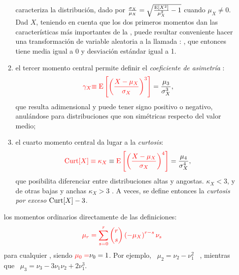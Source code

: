 \begin{itemize}
\begin{enumerate}
  caracteriza   la   distribuci\'on,    dado   por   $\frac{\sigma_X}{\mu_X}   =
  \sqrt{\frac{\operatorname{E}\left[    X^2   \right]}{\mu_X^2}-1}$   cuando    $\mu_X   \ne
  0$. \newline Dad $X$, teniendo en cuenta que los
  dos  primeros  momentos dan  las  caracter\'isticas  m\'as  importantes de  la
  , puede resultar  conveniente hacer una
  transformaci\'on  de  variable  aleatoria  a la  llamada  : ,
    que entonces  tiene media  igual a  0 y    desviaci\'on
  est\'andar igual a 1\modif{)}.
\item {} el tercer momento  central permite definir el
  {\it coeficiente de asimetr\'ia} :
  \[
  {\color{red} \gamma_X} {\color{red} \equiv  \operatorname{E}\left[ \left( \frac{X - \mu_X}{\sigma_X}
      \right)^3 \right]} = \frac{\mu_3}{\sigma_X^3},
  \]
   que resulta adimensional y
  puede tener  signo positivo o  negativo, anul\'andose para  distribuciones que
  son sim\'etricas respecto del valor medio;
\item  {}  el  cuarto momento  central da  lugar a  la
  \emph{curtosis}:
  \[
  {\color{red} \operatorname{Curt}[X]  \equiv \kappa_X}  \equiv {\color{red} \operatorname{E}\left[  \left(  \frac{X -
          \mu_X}{\sigma_X} \right)^4 \right]} = \frac{\mu_4}{\sigma_X^4},
  \]
   que posibilita diferenciar
  entre distribuciones  altas y angostas.    $\kappa_X  <  3$,  y  de otras  bajas  y  anchas  
  $\kappa_X > 3$ .  A veces,  se define entonces la {\it  curtosis por exceso}
  $\operatorname{Curt}[X] - 3$.
  \end{enumerate}
   los momentos ordinarios directamente de las definiciones:
  \[
  {\color{red} \mu_r = \sum_{s=0}^r \binom{r}{s} \left( - \mu_X \right)^{r-s} \nu_s}
  \]
  para cualquier ,  siendo ${\color{red} \mu_0 = } \nu_0=1$.  Por
  ejemplo, \ $\mu_2=\nu_2-\nu_1^2$ \ , mientras que \ $\mu_3=\nu_3-3\nu_1\nu_2+2\nu_1^3$.
\end{itemize}

